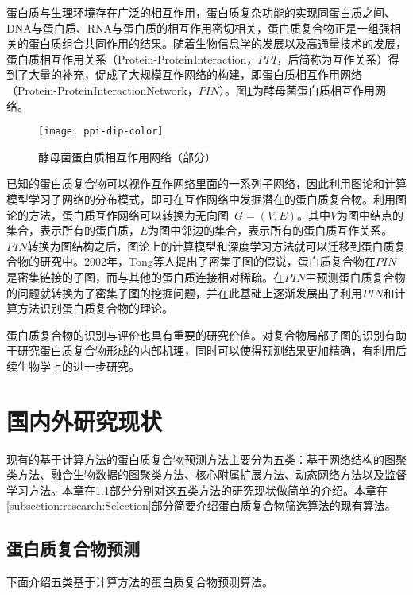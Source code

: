 蛋白质与生理环境存在广泛的相互作用，蛋白质复杂功能的实现同蛋白质之间、DNA与蛋白质、RNA与蛋白质的相互作用密切相关，蛋白质复合物正是一组强相关的蛋白质组合共同作用的结果。随着生物信息学的发展以及高通量技术的发展，蛋白质相互作用关系（Protein-ProteinInteraction，$PPI$，后简称为互作关系）得到了大量的补充，促成了大规模互作网络的构建\cite{butland_interaction_2005}，即蛋白质相互作用网络（Protein-ProteinInteractionNetwork，$PIN$）。图\ref{fig:ppi}为酵母菌蛋白质相互作用网络。
\begin{figure}[htbp]
  \centering
  \texttt{[image: ppi-dip-color]}
  \caption{酵母菌蛋白质相互作用网络（部分）}
  \label{fig:ppi}
\end{figure}

已知的蛋白质复合物可以视作互作网络里面的一系列子网络，因此利用图论和计算模型学习子网络的分布模式，即可在互作网络中发掘潜在的蛋白质复合物\cite{legrain_proteinprotein_2001}。利用图论的方法，蛋白质互作网络可以转换为无向图~$G=(V,E)$。其中$V$为图中结点的集合，表示所有的蛋白质，$E$为图中邻边的集合，表示所有的蛋白质互作关系。$PIN$转换为图结构之后，图论上的计算模型和深度学习方法就可以迁移到蛋白质复合物的研究中。2002年，Tong\cite{tong_combined_2002}等人提出了密集子图的假说，蛋白质复合物在$PIN$是密集链接的子图，而与其他的蛋白质连接相对稀疏。在$PIN$中预测蛋白质复合物的问题就转换为了密集子图的挖掘问题，并在此基础上逐渐发展出了利用$PIN$和计算方法识别蛋白质复合物的理论。

蛋白质复合物的识别与评价也具有重要的研究价值。对复合物局部子图的识别有助于研究蛋白质复合物形成的内部机理，同时可以使得预测结果更加精确，有利用后续生物学上的进一步研究。

\section{国内外研究现状}
\label{section:intro:research}

现有的基于计算方法的蛋白质复合物预测方法主要分为五类：基于网络结构的图聚类方法、融合生物数据的图聚类方法、核心附属扩展方法、动态网络方法以及监督学习方法。本章在\ref{subsection:research:Prediction}部分分别对这五类方法的研究现状做简单的介绍。本章在\ref{subsection:research:Selection}部分简要介绍蛋白质复合物筛选算法的现有算法。

\subsection{蛋白质复合物预测}
\label{subsection:research:Prediction}

下面介绍五类基于计算方法的蛋白质复合物预测算法。

